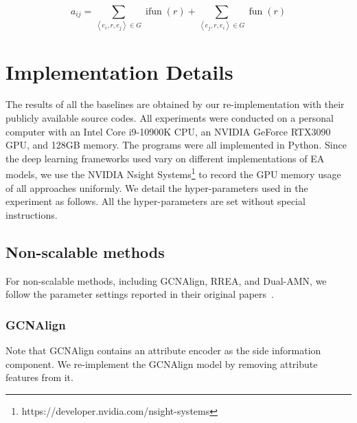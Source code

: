 \begin{equation}
a_{i j}=\sum_{\left\langle e_{i}, r, e_{j}\right\rangle \in G} \operatorname { ifun }(r)+\sum_{\left\langle e_{j}, r, e_{i}\right\rangle \in G}\operatorname{fun}(r)
\end{equation}




\section{Implementation Details}
\label{app:details}
The results of all the baselines are obtained by our re-implementation with their publicly available source codes.
All experiments were conducted on a personal computer with an Intel Core i9-10900K CPU, an NVIDIA GeForce RTX3090 GPU, and 128GB memory. The programs were all implemented in Python.
Since the deep learning frameworks used vary on different implementations of EA models, we use the NVIDIA Nsight Systems\footnote{https://developer.nvidia.com/nsight-systems} to record the GPU memory usage of all approaches uniformly.
We detail the hyper-parameters used in the experiment as follows. All the hyper-parameters are set without special instructions.

\subsection{Non-scalable methods} For non-scalable methods, including GCNAlign, RREA, and Dual-AMN, we follow the parameter settings reported in their original papers~\cite{GCN-Align18,RREA20, DualAMN21}.

\subsubsection{GCNAlign}
Note that GCNAlign contains an attribute encoder as the side information component.
We re-implement the GCNAlign model by removing attribute features from it.

